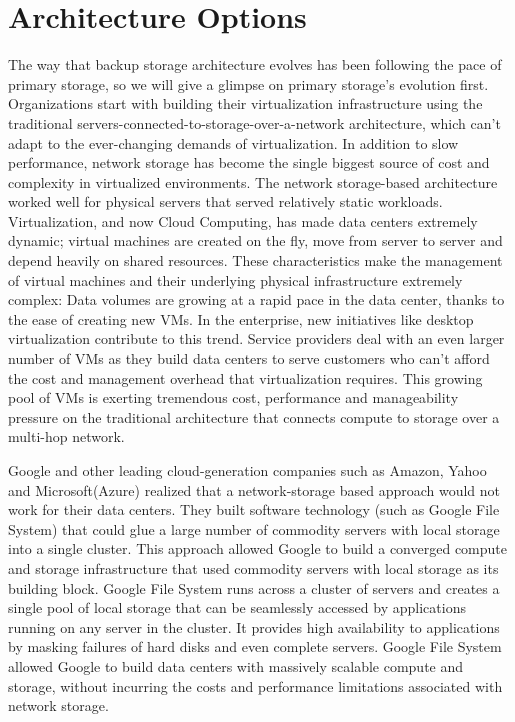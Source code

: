\section{Architecture Options} 
\label{back:arch}
The way that backup storage architecture evolves has been following the pace of
primary storage, so we will give a glimpse on primary storage's evolution first.
Organizations start with building their virtualization infrastructure using the
traditional servers-connected-to-storage-over-a-network architecture, which
can’t adapt to the ever-changing demands of virtualization. In addition to slow
performance, network storage has become the single biggest source of cost and
complexity in virtualized environments. The network storage-based architecture
worked well for physical servers that served relatively static workloads.
Virtualization, and now Cloud Computing, has made data centers extremely
dynamic\cite{berkeleycloud09}; virtual machines are created on the fly, move from server to server and
depend heavily on shared resources. These characteristics make the management
of virtual machines and their underlying physical infrastructure extremely
complex: Data volumes are growing at a rapid pace in the data center, thanks to the ease
of creating new VMs. In the enterprise, new initiatives like desktop virtualization
contribute to this trend. Service providers deal with an even larger number of
VMs as they build data centers to serve customers who can’t afford the cost
and management overhead that virtualization requires. This growing pool of
VMs is exerting tremendous cost, performance and manageability pressure on
the traditional architecture that connects compute to storage over a multi-hop
network.

Google\cite{googlefs03} and other leading cloud-generation companies such as Amazon, Yahoo
and Microsoft(Azure)\cite{azure} realized that a network-storage based approach would
not work for their data centers. They built software technology (such as Google
File System) that could glue a large number of commodity servers with local
storage into a single cluster. This approach allowed Google to build a converged
compute and storage infrastructure that used commodity servers with local
storage as its building block\cite{deconstructing05}. Google File System runs across a cluster of servers
and creates a single pool of local storage that can be seamlessly accessed by
applications running on any server in the cluster. It provides high availability
to applications by masking failures of hard disks and even complete servers.
Google File System allowed Google to build data centers with massively scalable
compute and storage, without incurring the costs and performance limitations
associated with network storage.

